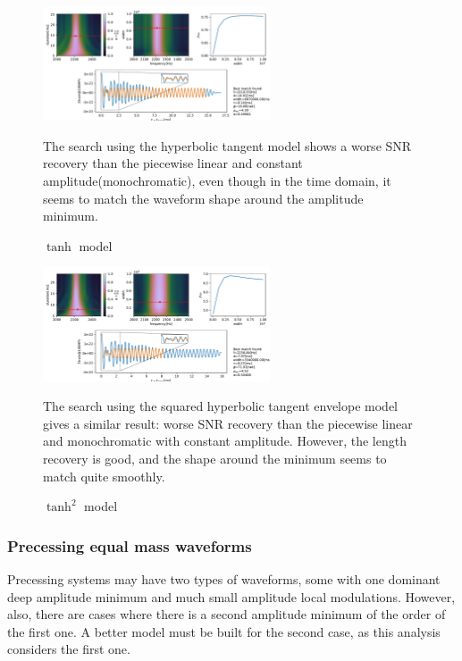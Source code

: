 \begin{figure}[hbt!]
\begin{center}
\includegraphics[width=0.6\textwidth, angle=0]{images/Data_analysis/results/envel_35_tanh.pdf}
\caption{$\tanh$ model}
\end{center}
The search using the hyperbolic tangent model shows a worse SNR recovery than the piecewise linear and constant amplitude(monochromatic), even though in the time domain, it seems to match the waveform shape around the amplitude minimum. 
\end{figure}

\begin{figure}[hbt!]
\begin{center}
\includegraphics[width=0.6\textwidth, angle=0]{images/Data_analysis/results/envel_35_tanh2.pdf}
\caption{$\tanh^2$ model}
\end{center}
The search using the squared hyperbolic tangent envelope model gives a similar result: worse SNR recovery than the piecewise linear and monochromatic with constant amplitude. However, the length recovery is good, and the shape around the minimum seems to match quite smoothly.
\end{figure}

\FloatBarrier


\subsubsection*{Precessing equal mass waveforms}

Precessing systems may have two types of waveforms, some with one dominant deep amplitude minimum and much small amplitude local modulations. However, also, there are cases where there is a second amplitude minimum of the order of the first one. A better model must be built for the second case, as this analysis considers the first one.

